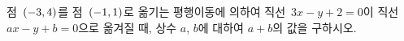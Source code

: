 점~$(-3{,}\mkern3mu\mathopen{}4)$를 점~$(-1{,}\mkern3mu\mathopen{}1)$로 옮기는 평행이동에 의하여 직선~$3x-y+2=0$이 직선~$ax-y+b=0$으로 옮겨질 때, 상수 $a$, $b$에 대하여 $a+b$의 값을 구하시오.
